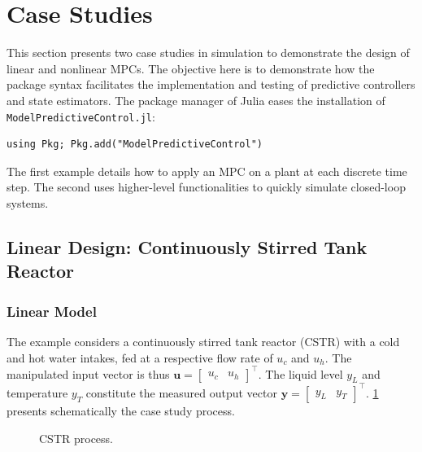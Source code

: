 \section{Case Studies}
\label{sec:case_studies}

This section presents two case studies in simulation to demonstrate the design of linear and nonlinear MPCs. The objective here is to demonstrate how the package syntax facilitates the implementation and testing of predictive controllers and state estimators. The package manager of Julia eases the installation of \texttt{ModelPredictiveControl.jl}:
\begin{verbatim}
using Pkg; Pkg.add("ModelPredictiveControl")
\end{verbatim}
The first example details how to apply an MPC on a plant at each discrete time step. The second uses higher-level functionalities to quickly simulate closed-loop systems.

\subsection{Linear Design: Continuously Stirred Tank Reactor}

\subsubsection{Linear Model}

The example considers a continuously stirred tank reactor (CSTR) with a cold and hot water intakes, fed at a respective flow rate of $u_c$ and $u_h$. The manipulated input vector is thus $\mathbf{u} = [\begin{smallmatrix}u_c & u_h\end{smallmatrix}]^\intercal$. The liquid level $y_L$ and temperature $y_T$ constitute the measured output vector $\mathbf{y} = [\begin{smallmatrix}y_L & y_T\end{smallmatrix}]^\intercal$. \cref{fig:cstr} presents schematically the case study process.

\begin{figure}[ht]
    \centering
    
    \caption{CSTR process.}\label{fig:cstr}
\end{figure}

